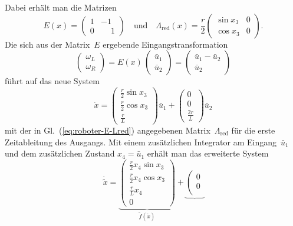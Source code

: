 \begin{example}
Dabei erhält man die Matrizen 
\begin{equation}
E(x)=\left(\begin{array}{cc}
1 & -1\\
0 & \phantom{-}1
\end{array}\right)\quad\text{und}\quad\Lambda_{\text{red}}(x)=\frac{r}{2}\left(\begin{array}{cc}
\sin x_{3} & 0\\
\cos x_{3} & 0
\end{array}\right).\label{eq:roboter-E-Lred}
\end{equation}
Die sich aus der Matrix~$E$ ergebende Eingangstransformation 
\[
\left(\begin{array}{c}
\omega_{L}\\
\omega_{R}
\end{array}\right)=E(x)\,\left(\begin{array}{c}
\bar{u}_{1}\\
\bar{u}_{2}
\end{array}\right)=\left(\begin{array}{c}
\bar{u}_{1}-\bar{u}_{2}\\
\bar{u}_{2}
\end{array}\right)
\]
führt auf das neue System 
\[
\dot{x}=\left(\begin{array}{c}
\frac{r}{2}\sin x_{3}\\
\frac{r}{2}\cos x_{3}\\
\frac{r}{L}
\end{array}\right)\bar{u}_{1}+\left(\begin{array}{c}
0\\
0\\
\frac{2r}{L}
\end{array}\right)\bar{u}_{2}
\]
mit der in Gl.~(\ref{eq:roboter-E-Lred}) angegebenen Matrix~$\Lambda_{\text{red}}$
für die erste Zeitableitung des Ausgangs. Mit einem zusätzlichen Integrator
am Eingang~$\bar{u}_{1}$ und dem zusätzlichen Zustand $x_{4}=\bar{u}_{1}$
erhält man das erweiterte System
\[
\dot{\tilde{x}}=\underbrace{\left(\begin{array}{c}
\frac{r}{2}x_{4}\sin x_{3}\\
\frac{r}{2}x_{4}\cos x_{3}\\
\frac{r}{L}x_{4}\\
0
\end{array}\right)}_{{\displaystyle \tilde{f}(\tilde{x})}}+\underbrace{\left(\begin{array}{c}
0\\
0\\

\end{array}}\]
\end{example}
